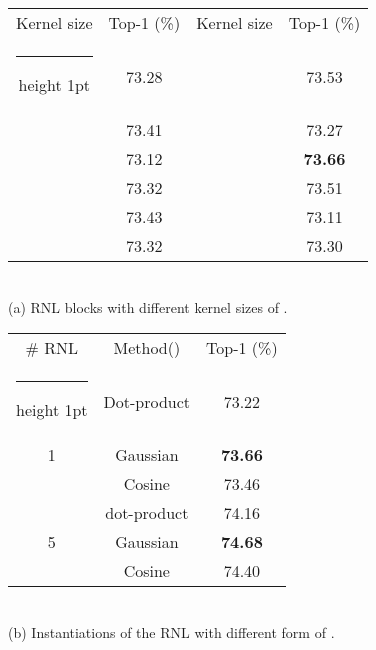 \documentclass[a4paper,conference]{IEEEtran}
\makeatletter
\newcommand{\thickhline}{\noalign {\ifnum 0=`}\fi \hrule height 1pt
    \futurelet \reserved@a \@xhline
}
\makeatother
\begin{document}
\begin{table*}
    \makeatletter{}\makeatother\caption{Exploration of the effectiveness and efficiency of various RNL modules on Kinetics-400. For the models in (a) and (c), we insert one Gaussian RNL block into the res3 stage of ResNet-50.}
\label{table:exploration}
\begin{minipage}[t]{0.001\textwidth}
    \quad
    \end{minipage}
    \begin{minipage}[t]{0.3\textwidth}
    \vspace{0pt}
\setlength{\tabcolsep}{5pt}
    \begin{tabular}{cc|cc}
    Kernel size & Top-1 (\%) & Kernel size & Top-1 (\%)\\
    \thickhline
     & 73.28 &  & 73.53 \\
     & 73.41 &  & 73.27 \\
     & 73.12 &  & \textbf{73.66} \\
     & 73.32 &  & 73.51\\
     & 73.43 &  & 73.11 \\
     & 73.32 &  & 73.30 \\
    \end{tabular}\\
(a) RNL blocks with different kernel sizes of .
    \end{minipage}
    \begin{minipage}[t]{0.05\textwidth}
    \quad
    \end{minipage}
\begin{minipage}[t]{0.25\textwidth}
\vspace{0pt}
\begin{tabular}{ccc}
    \# RNL & Method() & Top-1 (\%)  \\
    \thickhline
    &Dot-product & 73.22\\ 
    1&Gaussian & \textbf{73.66}\\ 
    &Cosine & 73.46\\ 
    \hline
    &dot-product & 74.16\\ 
    5&Gaussian & \textbf{74.68}\\ 
    &Cosine & 74.40
\end{tabular}\\
    (b) Instantiations of the RNL with different form of .\\
    \end{minipage}
    \begin{minipage}[t]{0.03\textwidth}
    \quad
    \end{minipage}

\end{table*}
\end{document}
